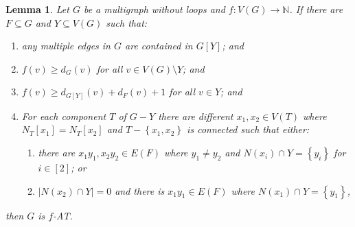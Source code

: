 \documentclass[12pt]{article}
\theoremstyle{plain}
\newtheorem{lem}[thm]{Lemma}
\theoremstyle{definition}
\theoremstyle{remark}
\newcommand{\IN}{\mathbb{N}}
\newcommand{\set}[1]{\left\{ #1 \right\}}
\newcommand{\card}[1]{\left|#1\right|}
\newcommand{\func}[3]{#1\colon #2 \rightarrow #3}
\newcommand{\irange}[1]{\left[#1\right]}
\begin{document}
\begin{lem}\label{GeneralEulerLemma}
	Let $G$ be a multigraph without loops and $\func{f}{V(G)}{\IN}$. If there are $F \subseteq G$ and
	$Y \subseteq V(G)$ such that:
	\begin{enumerate}
		\item any multiple edges in $G$ are contained in $G[Y]$; and
		\item $f(v) \ge d_G(v)$ for all $v \in V(G) \setminus Y$; and
		\item $f(v) \ge d_{G[Y]}(v) + d_F(v) + 1$ for all $v \in Y$; and
		\item For each component $T$ of $G-Y$ there are different $x_1, x_2 \in V(T)$ where $N_T[x_1] = N_T[x_2]$ and $T - \set{x_1, x_2}$ is connected such that either:
		\begin{enumerate}
			\item there are $x_1y_1, x_2y_2 \in E(F)$ where $y_1 \ne y_2$ and $N(x_i) \cap Y = \set{y_i}$ for $i \in \irange{2}$; or
			\item $\card{N(x_2) \cap Y} = 0$ and there is $x_1y_1 \in E(F)$ where $N(x_1) \cap Y = \set{y_1}$,
		\end{enumerate}
	\end{enumerate}
	
	\noindent then $G$ is $f$-AT.
\end{lem}
\end{document}
